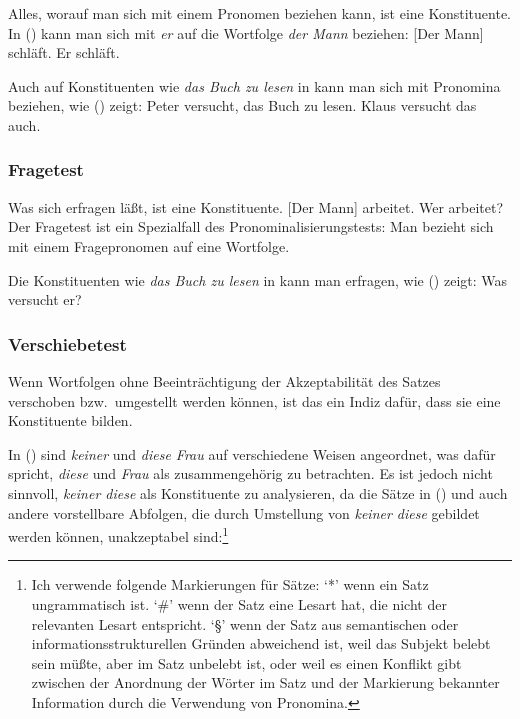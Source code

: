 Alles,
worauf man sich mit einem Pronomen beziehen kann, ist eine Konstituente. 
In () kann man sich \zb mit \emph{er} auf die Wortfolge \emph{der Mann} beziehen:
\eal
\ex {}[Der Mann] schläft.
\ex Er schläft.
\zl

\noindent
Auch auf Konstituenten wie \emph{das Buch zu lesen} in 
kann man sich mit Pronomina beziehen, wie () zeigt:
\eal
\ex Peter versucht, das Buch zu lesen.
\ex Klaus versucht das auch.
\zl


\subsubsection{Fragetest}

Was sich erfragen läßt, ist eine Konstituente.
        \eal
        \ex {}[Der Mann] arbeitet.
        \ex Wer arbeitet?
        \zl
        Der Fragetest ist ein Spezialfall des Pronominalisierungstests: Man bezieht sich mit
        einem Fragepronomen auf eine Wortfolge.

Die Konstituenten wie \emph{das Buch zu lesen} in  kann man erfragen,
wie () zeigt:
\ea
Was versucht er?
\z

\subsubsection{Verschiebetest}

Wenn Wortfolgen ohne Beeinträchtigung der Akzeptabilität des Satzes verschoben
bzw.\ umgestellt werden können, ist das ein Indiz dafür, dass sie eine Konstituente bilden.

        In () sind \emph{keiner} und \emph{diese Frau} auf verschiedene Weisen angeordnet,
        was dafür spricht, \emph{diese} und \emph{Frau} als zusammengehörig zu betrachten.
        \eal
        \zl
Es ist jedoch nicht sinnvoll, \emph{keiner diese} als Konstituente zu analysieren,
da die Sätze in () und auch andere vorstellbare Abfolgen, die durch
Umstellung von \emph{keiner diese} gebildet werden können, unakzeptabel sind:\footnote{
  Ich verwende folgende Markierungen für Sätze: `*'\is{*} wenn ein Satz ungrammatisch ist.
  `\#'\is{\#} wenn der Satz eine Lesart hat, die nicht der relevanten Lesart entspricht.
  `\S'\is{\S} wenn der Satz aus semantischen oder informationsstrukturellen Gründen abweichend ist,
  \zb weil das Subjekt belebt sein müßte, aber im Satz unbelebt ist, oder weil es einen
  Konflikt gibt zwischen der Anordnung der Wörter im Satz und der Markierung bekannter
  Information durch die Verwendung von Pronomina.%
}
\eal
{}
\zl

